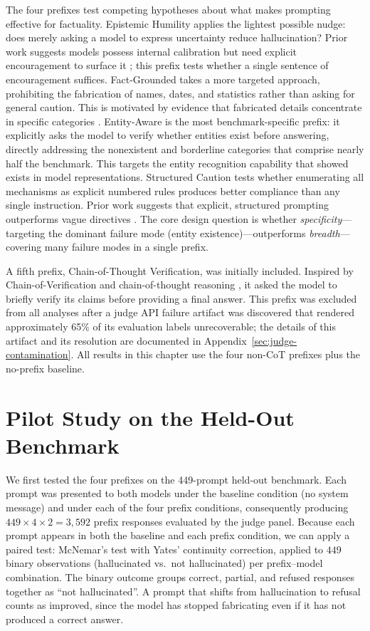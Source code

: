 The four prefixes test competing hypotheses about what makes prompting effective for factuality. Epistemic Humility applies the lightest possible nudge: does merely asking a model to express uncertainty reduce hallucination? Prior work suggests models possess internal calibration \citep{kadavath2022language} but need explicit encouragement to surface it \citep{yin2023large}; this prefix tests whether a single sentence of encouragement suffices. Fact-Grounded takes a more targeted approach, prohibiting the fabrication of names, dates, and statistics rather than asking for general caution. This is motivated by evidence that fabricated details concentrate in specific categories \citep{min2023factscore}.  Entity-Aware is the most benchmark-specific prefix: it explicitly asks the model to verify whether entities exist before answering, directly addressing the nonexistent and borderline categories that comprise nearly half the benchmark. This targets the entity recognition capability that \citet{ferrando2024knowledge} showed exists in model representations.  Structured Caution tests whether enumerating all mechanisms as explicit numbered rules produces better compliance than any single instruction.  Prior work suggests that explicit, structured prompting outperforms vague directives \citep{arora2024structured}. The core design question is whether \emph{specificity}---targeting the dominant failure mode (entity existence)---outperforms \emph{breadth}---covering many failure modes in a single prefix.

A fifth prefix, Chain-of-Thought Verification, was initially included.  Inspired by Chain-of-Verification \citep{dhuliawala2023chainofverification} and chain-of-thought reasoning \citep{wei2022chainofthought}, it asked the model to briefly verify its claims before providing a final answer. This prefix was excluded from all analyses after a judge API failure artifact was discovered that rendered approximately 65\% of its evaluation labels unrecoverable; the details of this artifact and its resolution are documented in Appendix~\ref{sec:judge-contamination}. All results in this chapter use the four non-CoT prefixes plus the no-prefix baseline.

\section{Pilot Study on the Held-Out Benchmark}
\label{sec:pilot-study}

We first tested the four prefixes on the 449-prompt held-out benchmark.  Each prompt was presented to both models under the baseline condition (no system message) and under each of the four prefix conditions, consequently producing $449 \times 4 \times 2 = 3{,}592$ prefix responses evaluated by the judge panel. Because each prompt appears in both the baseline and each prefix condition, we can apply a paired test: McNemar's test with Yates' continuity correction, applied to $449$ binary observations (hallucinated vs.\ not hallucinated) per prefix--model combination.  The binary outcome groups correct, partial, and refused responses together as ``not hallucinated''. A prompt that shifts from hallucination to refusal counts as improved, since the model has stopped fabricating even if it has not produced a correct answer.


